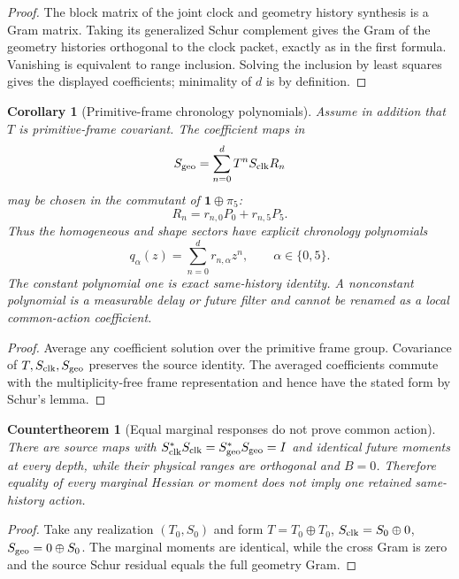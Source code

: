 \documentclass[11pt]{article}
\newtheorem{corollary}[theorem]{Corollary}
\newtheorem{countertheorem}[theorem]{Countertheorem}
\theoremstyle{definition}
\theoremstyle{remark}
\begin{document}
\begin{proof}
The block matrix of the joint clock and geometry history synthesis is a Gram
matrix.  Taking its generalized Schur complement gives the Gram of the
geometry histories orthogonal to the clock packet, exactly as in the first
formula.  Vanishing is equivalent to range inclusion.  Solving the inclusion
by least squares gives the displayed coefficients; minimality of $d$ is by
definition.
\end{proof}

\begin{corollary}[Primitive-frame chronology polynomials]
\label{cor:clock-geometry-chronology-polynomial-master}
Assume in addition that $T$ is primitive-frame covariant.  The coefficient maps
in
\[
  S_{\rm geo}=\sum_{n=0}^{d}T^nS_{\rm clk}R_n
\]
may be chosen in the commutant of $\mathbf1\oplus\pi_5$:
\[
  R_n=r_{n,0}P_0+r_{n,5}P_5.
\]
Thus the homogeneous and shape sectors have explicit chronology polynomials
\[
  \boxed{
  q_\alpha(z)=\sum_{n=0}^{d}r_{n,\alpha}z^n,
  \qquad \alpha\in\{0,5\}.}
\]
The constant polynomial one is exact same-history identity.  A nonconstant
polynomial is a measurable delay or future filter and cannot be renamed as a
local common-action coefficient.
\end{corollary}

\begin{proof}
Average any coefficient solution over the primitive frame group.  Covariance of
$T,S_{\rm clk},S_{\rm geo}$ preserves the source identity.  The averaged
coefficients commute with the multiplicity-free frame representation and hence
have the stated form by Schur's lemma.
\end{proof}



\begin{countertheorem}[Equal marginal responses do not prove common action]
\label{cth:equal-Hessian-not-source-master}
There are source maps with
$S_{\rm clk}^*S_{\rm clk}=S_{\rm geo}^*S_{\rm geo}=I$ and identical future
moments at every depth, while their physical ranges are orthogonal and
$B=0$.  Therefore equality of every marginal Hessian or moment does not imply
one retained same-history action.
\end{countertheorem}

\begin{proof}
Take any realization $(T_0,S_0)$ and form
$T=T_0\oplus T_0$,
$S_{\rm clk}=S_0\oplus0$,
$S_{\rm geo}=0\oplus S_0$.  The marginal moments are identical, while the
cross Gram is zero and the source Schur residual equals the full geometry Gram.
\end{proof}
\end{document}
